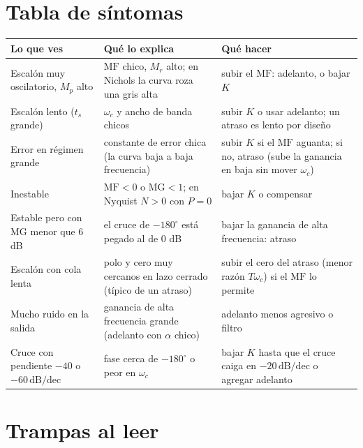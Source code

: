 \documentclass[11pt,a4paper]{article}
\newcommand{\dBdec}{\,\mathrm{dB/dec}}
\newcommand{\wc}{\omega_c}
\newcommand{\MF}{\mathrm{MF}}
\newcommand{\MG}{\mathrm{MG}}
\newcommand{\Mr}{M_r}
\begin{document}
\section{Tabla de síntomas}
\label{sec:sintomas}

\begin{center}
\small
\begin{tabularx}{\textwidth}{@{}>{\raggedright\arraybackslash}p{3.6cm}>{\raggedright\arraybackslash}X>{\raggedright\arraybackslash}X@{}}
\toprule
Lo que ves & Qué lo explica & Qué hacer\\
\midrule
Escalón muy oscilatorio, $M_p$ alto & $\MF$ chico, $\Mr$ alto; en Nichols la curva roza una gris alta & subir el $\MF$: adelanto, o bajar $K$ \\
Escalón lento ($t_s$ grande) & $\wc$ y ancho de banda chicos & subir $K$ o usar adelanto; un atraso es lento por diseño \\
Error en régimen grande & constante de error chica (la curva baja a baja frecuencia) & subir $K$ si el $\MF$ aguanta; si no, atraso (sube la ganancia en baja sin mover $\wc$) \\
Inestable & $\MF<0$ o $\MG<1$; en Nyquist $N>0$ con $P=0$ & bajar $K$ o compensar \\
Estable pero con $\MG$ menor que 6 dB & el cruce de $-180^\circ$ está pegado al de 0 dB & bajar la ganancia de alta frecuencia: atraso \\
Escalón con cola lenta & polo y cero muy cercanos en lazo cerrado (típico de un atraso) & subir el cero del atraso (menor razón $T\wc$) si el $\MF$ lo permite \\
Mucho ruido en la salida & ganancia de alta frecuencia grande (adelanto con $\alpha$ chico) & adelanto menos agresivo o filtro \\
Cruce con pendiente $-40$ o $-60\dBdec$ & fase cerca de $-180^\circ$ o peor en $\wc$ & bajar $K$ hasta que el cruce caiga en $-20\dBdec$ o agregar adelanto \\
\bottomrule
\end{tabularx}
\end{center}

\section{Trampas al leer}
\end{document}
